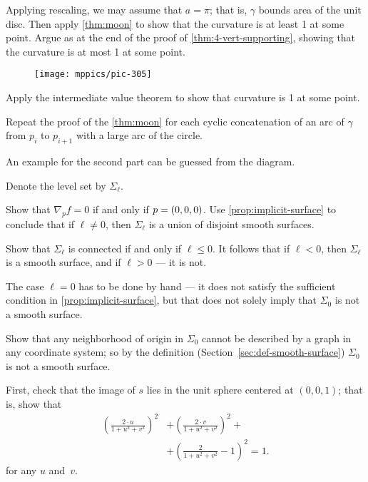 \begin{multicols}{2}
Applying rescaling, we may assume that $a=\pi$; that is, $\gamma$ bounds area of the unit disc.
Then apply \ref{thm:moon} to show that the curvature is at least 1 at some point.
Argue as at the end of the proof of \ref{thm:4-vert-supporting}, showing that the curvature is at most 1 at some point.

{

\begin{wrapfigure}{r}{20 mm}
\vskip-2mm
\centering
\texttt{[image: mppics/pic-305]}
\vskip0mm
\end{wrapfigure}

Apply the intermediate value theorem to show that curvature is  1 at some point.

Repeat the proof of the \ref{thm:moon} for each cyclic concatenation of an arc of $\gamma$ from $p_i$ to $p_{i+1}$ with a large arc of the circle. 

}

An example for the second part can be guessed from the diagram.


\setcounter{eqtn}{0}

Denote the level set by $\Sigma_\ell$.

Show that $\nabla_p f=0$ if and only if $p\z=(0,0,0)$.
Use \ref{prop:implicit-surface} to conclude that if $\ell\ne 0$, then $\Sigma_\ell$ is a union of disjoint smooth surfaces.

Show that $\Sigma_\ell$ is connected if and only if $\ell\le 0$.
It follows that if $\ell<0$, then $\Sigma_\ell$ is a smooth surface, and if $\ell>0$ --- it is not.

The case $\ell=0$ has to be done by hand --- it does not satisfy the sufficient condition in \ref{prop:implicit-surface}, but that does not solely imply that $\Sigma_0$ is not a smooth surface.

Show that any neighborhood of origin in $\Sigma_0$ cannot be described by a graph in any coordinate system;
so by the definition (Section~\ref{sec:def-smooth-surface}) $\Sigma_0$ is not a smooth surface.

First, check that the image of $s$ lies in the unit sphere centered at $(0,0,1)$;
that is, show that 
\begin{align*}
\left(\tfrac{2\cdot u}{1+u^2+v^2}\right)^2
&+
\left(\tfrac{2\cdot v}{1+u^2+v^2}\right)^2+
\\
&+\left(\tfrac{2}{1+u^2+v^2}-1\right)^2=1.
\end{align*}
for any $u$ and~$v$.


\end{multicols}
